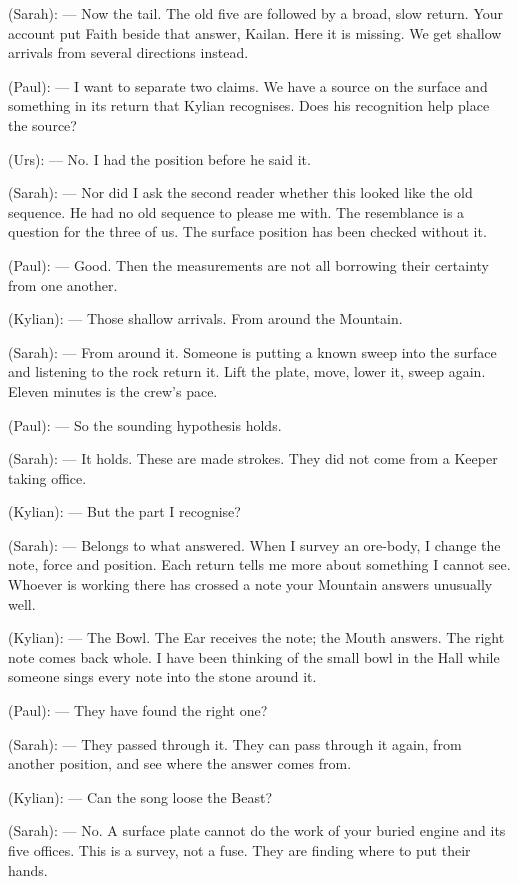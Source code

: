 \begin{room}
(Sarah): --- Now the tail. The old five are followed by a broad, slow return. Your account put Faith beside that answer, Kailan. Here it is missing. We get shallow arrivals from several directions instead.

(Paul): --- I want to separate two claims. We have a source on the surface and something in its return that Kylian recognises. Does his recognition help place the source?

(Urs): --- No. I had the position before he said it.

(Sarah): --- Nor did I ask the second reader whether this looked like the old sequence. He had no old sequence to please me with. The resemblance is a question for the three of us. The surface position has been checked without it.

(Paul): --- Good. Then the measurements are not all borrowing their certainty from one another.

(Kylian): --- Those shallow arrivals. From around the Mountain.

(Sarah): --- From around it. Someone is putting a known sweep into the surface and listening to the rock return it. Lift the plate, move, lower it, sweep again. Eleven minutes is the crew's pace.

(Paul): --- So the sounding hypothesis holds.

(Sarah): --- It holds. These are made strokes. They did not come from a Keeper taking office.

(Kylian): --- But the part I recognise?

(Sarah): --- Belongs to what answered. When I survey an ore-body, I change the note, force and position. Each return tells me more about something I cannot see. Whoever is working there has crossed a note your Mountain answers unusually well.

(Kylian): --- The Bowl. The Ear receives the note; the Mouth answers. The right note comes back whole. I have been thinking of the small bowl in the Hall while someone sings every note into the stone around it.

(Paul): --- They have found the right one?

(Sarah): --- They passed through it. They can pass through it again, from another position, and see where the answer comes from.

(Kylian): --- Can the song loose the Beast?

(Sarah): --- No. A surface plate cannot do the work of your buried engine and its five offices. This is a survey, not a fuse. They are finding where to put their hands.


\end{room}
